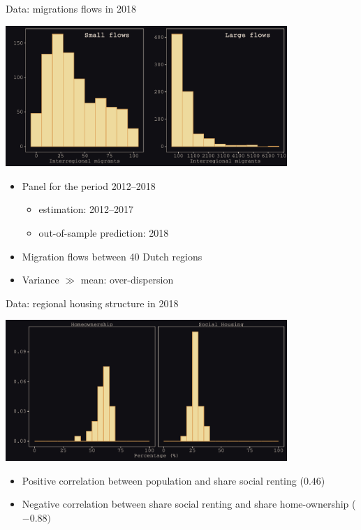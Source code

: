 \documentclass{beamer}
\begin{document}
\begin{frame}{Data: migrations flows in 2018}
	\begin{center}
		\includegraphics[width=0.8\textwidth]{../../fig/hist_mig_corop}      
	\end{center}
\begin{itemize}
  \item Panel for the period 2012--2018
	\begin{itemize}
		\item estimation: 2012--2017
		\item out-of-sample prediction: 2018
	\end{itemize}
	\item Migration flows \alert{between} 40 Dutch regions
	\item Variance $\gg$ mean: \alert{over-dispersion}
\end{itemize}
\end{frame}

\begin{frame}{Data: regional housing structure in 2018}
\begin{center}
	\includegraphics[width=0.8\textwidth]{../../fig/hist_housing_corop}
\end{center}
\begin{itemize}
	\item Positive correlation between population and share social renting ($0.46$)
	\item Negative correlation between share social renting and share home-ownership ($-0.88)$
\end{itemize}
\end{frame}
\end{document}
